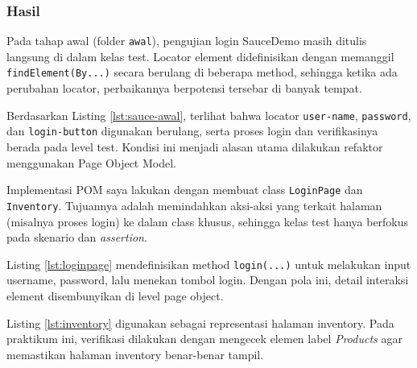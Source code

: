 \documentclass[a4paper,oneside,11pt]{book}
\newcounter{subsubsubsection}[subsubsection]
\begin{document}
\subsubsection{Hasil}
\par Pada tahap awal (folder \texttt{awal}), pengujian login SauceDemo masih ditulis langsung di dalam kelas test. Locator element didefinisikan dengan memanggil \texttt{findElement(By...)} secara berulang di beberapa method, sehingga ketika ada perubahan locator, perbaikannya berpotensi tersebar di banyak tempat.



\par Berdasarkan Listing \ref{lst:sauce-awal}, terlihat bahwa locator \texttt{user-name}, \texttt{password}, dan \texttt{login-button} digunakan berulang, serta proses login dan verifikasinya berada pada level test. Kondisi ini menjadi alasan utama dilakukan refaktor menggunakan Page Object Model.

\par Implementasi POM saya lakukan dengan membuat class \texttt{LoginPage} dan \texttt{Inventory}. Tujuannya adalah memindahkan aksi-aksi yang terkait halaman (misalnya proses login) ke dalam class khusus, sehingga kelas test hanya berfokus pada skenario dan \textit{assertion}.



\par Listing \ref{lst:loginpage} mendefinisikan method \texttt{login(...)} untuk melakukan input username, password, lalu menekan tombol login. Dengan pola ini, detail interaksi element disembunyikan di level page object.



\par Listing \ref{lst:inventory} digunakan sebagai representasi halaman inventory. Pada praktikum ini, verifikasi dilakukan dengan mengecek elemen label \textit{Products} agar memastikan halaman inventory benar-benar tampil.
\end{document}
